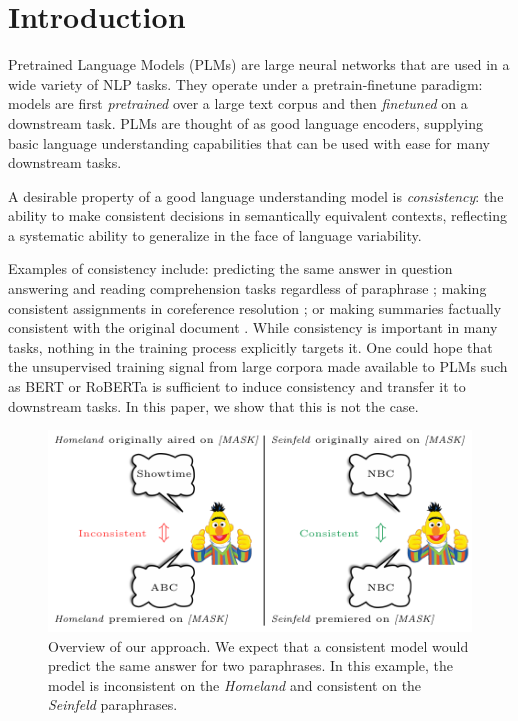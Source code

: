 \section{Introduction}
\label{sec:intro}

Pretrained Language Models (PLMs) are
large neural networks that are
used in a wide variety of NLP tasks. They operate under a
pretrain-finetune paradigm: models are first \emph{pretrained} over a large text corpus and then \emph{finetuned} on a downstream task. PLMs are thought of as good language encoders, supplying basic language understanding capabilities that can be used with ease for many downstream tasks.

A desirable property of a good language understanding model
is \emph{consistency}: the ability to make consistent
decisions in semantically equivalent contexts, reflecting a
systematic ability to generalize in the face of language variability.


Examples of consistency include: predicting the same answer in question answering and reading comprehension tasks regardless of paraphrase \cite{consistent-qa}; making consistent assignments in coreference resolution \cite{denis2009global,chang2011inference}; or making summaries factually consistent with the original document \cite{kryscinski2020evaluating}.
While consistency is important in many tasks, nothing in the training process explicitly targets it. One could hope that
the unsupervised training signal from large corpora
made available to PLMs such as BERT or RoBERTa
\cite{bert,roberta} is sufficient to induce consistency and
transfer it to downstream tasks.
In this paper, we show that this is not the case.



\begin{figure}[t!]
\centering

\includegraphics[width=1.\columnwidth]{figures/overview2}

\caption{Overview of our approach. 
We expect that a consistent model would predict the same answer for %
 two paraphrases.
In this example, the model is inconsistent on the
\textit{Homeland} and consistent on the \textit{Seinfeld} paraphrases.}
\label{fig:overview}
\end{figure}


